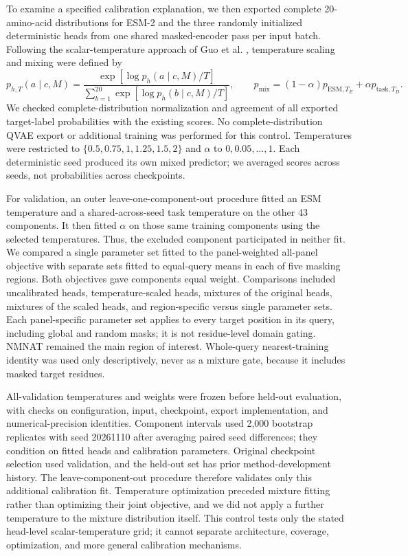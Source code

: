 \documentclass[referee,pdflatex,sn-vancouver-num]{sn-jnl}
\begin{document}
To examine a specified calibration explanation, we then exported complete 20-amino-acid distributions for ESM-2 and the three randomly initialized deterministic heads from one shared masked-encoder pass per input batch. Following the scalar-temperature approach of Guo et al. \cite{guo2017}, temperature scaling and mixing were defined by
\begin{equation}
 p_{h,T}(a\mid c,M)=\frac{\exp[\log p_h(a\mid c,M)/T]}{\sum_{b=1}^{20}\exp[\log p_h(b\mid c,M)/T]},
 \qquad p_{\mathrm{mix}}=(1-\alpha)p_{\mathrm{ESM},T_E}+\alpha p_{\mathrm{task},T_D}.
\end{equation}
We checked complete-distribution normalization and agreement of all exported target-label probabilities with the existing scores. No complete-distribution QVAE export or additional training was performed for this control. Temperatures were restricted to $\{0.5,0.75,1,1.25,1.5,2\}$ and $\alpha$ to $0,0.05,\ldots,1$. Each deterministic seed produced its own mixed predictor; we averaged scores across seeds, not probabilities across checkpoints.

For validation, an outer leave-one-component-out procedure fitted an ESM temperature and a shared-across-seed task temperature on the other 43 components. It then fitted $\alpha$ on those same training components using the selected temperatures. Thus, the excluded component participated in neither fit. We compared a single parameter set fitted to the panel-weighted all-panel objective with separate sets fitted to equal-query means in each of five masking regions. Both objectives gave components equal weight. Comparisons included uncalibrated heads, temperature-scaled heads, mixtures of the original heads, mixtures of the scaled heads, and region-specific versus single parameter sets. Each panel-specific parameter set applies to every target position in its query, including global and random masks; it is not residue-level domain gating. NMNAT remained the main region of interest. Whole-query nearest-training identity was used only descriptively, never as a mixture gate, because it includes masked target residues.

All-validation temperatures and weights were frozen before held-out evaluation, with checks on configuration, input, checkpoint, export implementation, and numerical-precision identities. Component intervals used 2,000 bootstrap replicates with seed 20261110 after averaging paired seed differences; they condition on fitted heads and calibration parameters. Original checkpoint selection used validation, and the held-out set has prior method-development history. The leave-component-out procedure therefore validates only this additional calibration fit. Temperature optimization preceded mixture fitting rather than optimizing their joint objective, and we did not apply a further temperature to the mixture distribution itself. This control tests only the stated head-level scalar-temperature grid; it cannot separate architecture, coverage, optimization, and more general calibration mechanisms.
\end{document}
